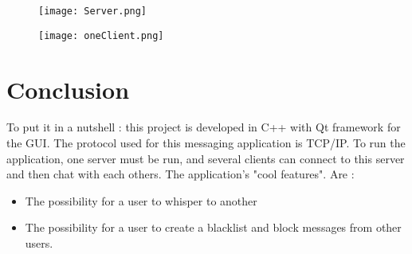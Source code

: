 \documentclass[12pt]{report}
\begin{document}
\begin{figure}
\centering
\begin{minipage}{.5\textwidth}
  \centering
  \texttt{[image: Server.png]}
\end{minipage}%
\begin{minipage}{.5\textwidth}
  \centering
  \texttt{[image: oneClient.png]}
  \label{fig:test2}
\end{minipage}
\end{figure}



\chapter{Conclusion}
To put it in a nutshell : this project is developed in C++ with Qt framework for the GUI.
The protocol used for this messaging application is TCP/IP. To run the application, one server must be run, and several clients can connect to this server and then chat with each others.
The application's "cool features". Are : 
\begin{itemize}
	\item The possibility for a user to whisper to another
	\item The possibility for a user to create a blacklist and block messages from other users.
\end{itemize}
\end{document}
